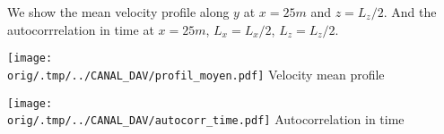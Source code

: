 We show the mean velocity profile along $y$ at $x = 25m$ and $z = L_z/2$. And the autocorrrelation in time at $x = 25m$, $L_x = L_x/2$, $L_z = L_z/2$.\\
\begin{minipage}{0.38\textwidth}
		\centering
        \texttt{[image: \\orig/.tmp/../CANAL\_DAV/profil\_moyen.pdf]}
Velocity mean profile
\end{minipage}
\begin{minipage}{0.42\textwidth}
		\centering
        \texttt{[image: \\orig/.tmp/../CANAL\_DAV/autocorr\_time.pdf]}
Autocorrelation in time
\end{minipage}\\
